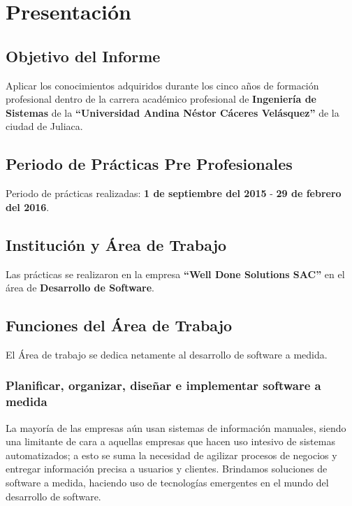 \chapter{Presentación}
	\section{Objetivo del Informe}
		Aplicar los conocimientos adquiridos durante los cinco años de formación
		profesional dentro de la carrera académico profesional de {\bf Ingeniería de
		Sistemas} de la  {\bf ``Universidad Andina Néstor Cáceres Velásquez''} de la
		ciudad de Juliaca.
	
	\section{Periodo de Prácticas Pre Profesionales}
		Periodo de prácticas realizadas: {\bf 1 de septiembre del 2015} - {\bf 29 de
		febrero del 2016}.
		
	\section{Institución y Área de Trabajo} 
		Las prácticas se realizaron en la empresa {\bf ``Well Done Solutions SAC''} en
		el área de {\bf Desarrollo de Software}.
		
	\section{Funciones del Área de Trabajo}
		El Área de trabajo se dedica netamente al desarrollo de software a medida.
		
		\subsection{Planificar, organizar, diseñar e implementar software a medida}
			La mayoría de las empresas aún usan sistemas de información manuales, siendo
			una limitante de cara a aquellas empresas que hacen uso intesivo de sistemas
			automatizados; a esto se suma la necesidad de agilizar procesos de negocios y
			entregar información precisa a usuarios y clientes. Brindamos soluciones de
			software a medida, haciendo uso de tecnologías emergentes en el mundo del desarrollo de software.

			

